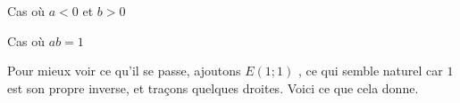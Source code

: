 \begin{center}
	\smallskip
	Cas où $a < 0$ et $b > 0$

	\medskip

	
	\smallskip
	Cas où $a b = 1$
\end{center}


\newpage

Pour mieux voir ce qu'il se passe, ajoutons $E(1 ; 1)$ , ce qui semble naturel car $1$ est son propre inverse, et traçons quelques droites. Voici ce que cela donne.

